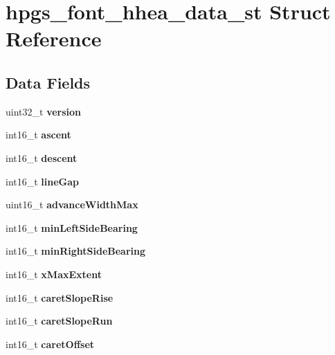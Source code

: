 \section{hpgs\_\-font\_\-hhea\_\-data\_\-st Struct Reference}
\label{structhpgs__font__hhea__data__st}
\subsection*{Data Fields}
\begin{DoxyCompactItemize}
\item 
uint32\_\-t {\bfseries version}\label{structhpgs__font__hhea__data__st_a4900b0bbaa6a94a031577b504b8bdbc0}

\item 
int16\_\-t {\bfseries ascent}\label{structhpgs__font__hhea__data__st_a94a2f8f0d8619d5bcb1fefd20584c032}

\item 
int16\_\-t {\bfseries descent}\label{structhpgs__font__hhea__data__st_a559df42b5909311cabd026e7276805a4}

\item 
int16\_\-t {\bfseries lineGap}\label{structhpgs__font__hhea__data__st_ad00075a72318884a4a7e996a3caa89a0}

\item 
uint16\_\-t {\bfseries advanceWidthMax}\label{structhpgs__font__hhea__data__st_a35702689445ad920eff3bd0621dc23cc}

\item 
int16\_\-t {\bfseries minLeftSideBearing}\label{structhpgs__font__hhea__data__st_a9d784433922399f2918f277dd8066fb4}

\item 
int16\_\-t {\bfseries minRightSideBearing}\label{structhpgs__font__hhea__data__st_a9d3fa10fd65fb8de1fd086d7ad8d7791}

\item 
int16\_\-t {\bfseries xMaxExtent}\label{structhpgs__font__hhea__data__st_a1c45d5c21fb2df8189b467f14b72ca38}

\item 
int16\_\-t {\bfseries caretSlopeRise}\label{structhpgs__font__hhea__data__st_a0904bea01eb4b4c6563eee827a67636d}

\item 
int16\_\-t {\bfseries caretSlopeRun}\label{structhpgs__font__hhea__data__st_a3b8a49a3c64f16a02c655ca2a45c2499}

\item 
int16\_\-t {\bfseries caretOffset}\label{structhpgs__font__hhea__data__st_a79f186339965ce8240275a293cf41625}


\end{DoxyCompactItemize}
